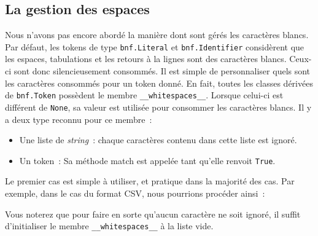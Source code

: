 \documentclass[a4paper]{article}
\newcommand{\fixed}[1]{\texttt{#1}}
\begin{document}
        \subsection{La gestion des espaces}
            Nous n'avons pas encore abordé la manière dont sont gérés les
            caractères blancs. Par défaut, les tokens de type \fixed{bnf.Literal}
            et \fixed{bnf.Identifier} considèrent que les espaces, tabulations
            et les retours à la lignes sont des caractères blancs. Ceux-ci sont
            donc silencieusement consommés. Il est simple de personnaliser quels sont
            les caractères consommés pour un token donné.
            En fait, toutes les classes dérivées de \fixed{bnf.Token} possèdent
            le membre \fixed{\_\_whitespaces\_\_}. Lorsque celui-ci est différent
            de \fixed{None}, sa valeur est utilisée pour consommer les caractères
            blancs. Il y a deux type reconnu pour ce membre~:
            \begin{itemize}
                \item Une liste de \emph{string}~: chaque caractères contenu dans
                cette liste est ignoré.
                \item Un token~: Sa méthode match est appelée tant qu'elle renvoit
                \fixed{True}.
            \end{itemize}
            Le premier cas est simple à utiliser, et pratique dans la majorité des cas.
            Par exemple, dans le cas du format CSV, nous pourrions procéder ainsi~:

            Vous noterez que pour faire en sorte qu'aucun caractère ne soit ignoré,
            il suffit d'initialiser le membre \fixed{\_\_whitespaces\_\_} à la liste
            vide.
\end{document}
